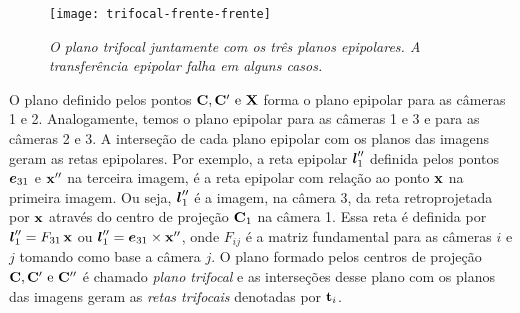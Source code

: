 \begin{figure}
\centering
\texttt{[image: trifocal-frente-frente]}
\caption{{\it O plano trifocal juntamente com os três planos epipolares. A transferência epipolar falha em alguns casos.}}
\label{fig.trifocal-frente}
\end{figure}

O plano definido pelos pontos ${\bf C}, {\bf C}' \,\,\text{e}\,\, \mathbf{X}$ forma o plano epipolar para as câmeras 1 e 2. Analogamente, temos o plano epipolar para as câmeras 1 e 3 e para as câmeras 2 e 3. A interseção de cada plano epipolar com os planos das imagens geram as retas epipolares. Por exemplo, a reta  epipolar $\boldsymbol{l}''_1$ definida pelos pontos $\boldsymbol{e}_{31}$ e $\mathbf{x}''$ na terceira imagem, é a reta epipolar com relação ao ponto $\mathbf{x}$ na primeira imagem. Ou seja, $\boldsymbol{l}''_1$ é a imagem, na câmera 3, da reta retroprojetada por $\mathbf{x}$ através do centro de projeção ${\bf C}_1$ na câmera 1. Essa reta é definida por $\boldsymbol{l}''_1=F_{31}\,\mathbf{x}$ ou $\boldsymbol{l}''_1=\boldsymbol{e}_{31}\times\mathbf{x}''$, onde $F_{ij}$ é a matriz fundamental para as câmeras $i$ e $j$ tomando como base a câmera $j$. O plano formado pelos centros de projeção ${\bf C}, {\bf C}' \,\,\text{e}\,\, {\bf C}''$ é chamado {\it plano trifocal} e as interseções desse plano com os planos das imagens geram as {\it retas trifocais} denotadas por ${\bf t}_i$.

